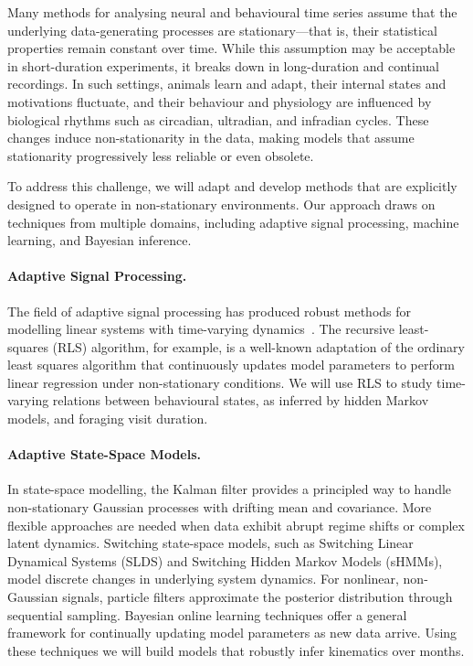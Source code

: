 

Many methods for analysing neural and behavioural time series assume that the
underlying data-generating processes are stationary—that is, their statistical
properties remain constant over time. While this assumption may be acceptable
in short-duration experiments, it breaks down in long-duration and continual
recordings. In such settings, animals learn and adapt, their internal states
and motivations fluctuate, and their behaviour and physiology are influenced by
biological rhythms such as circadian, ultradian, and infradian cycles. These
changes induce non-stationarity in the data, making models that assume
stationarity progressively less reliable or even obsolete.

To address this challenge, we will adapt and develop methods that are
explicitly designed to operate in non-stationary environments. Our approach
draws on techniques from multiple domains, including adaptive signal
processing, machine learning, and Bayesian inference.

\paragraph{Adaptive Signal Processing.}

The field of adaptive signal processing has produced robust methods for
modelling linear systems with time-varying dynamics~\cite{haykin02}. The
recursive least-squares (RLS) algorithm, for example, is a well-known
adaptation of the ordinary least squares algorithm that continuously updates
model parameters to perform linear regression under non-stationary conditions.
We will use RLS to study time-varying relations between behavioural states, as
inferred by hidden Markov models, and foraging visit duration.

\paragraph{Adaptive State-Space Models.}

In state-space modelling, the Kalman filter provides a principled way to handle
non-stationary Gaussian processes with drifting mean and covariance. More
flexible approaches are needed when data exhibit abrupt regime shifts or
complex latent dynamics. Switching state-space models, such as Switching Linear
Dynamical Systems (SLDS) and Switching Hidden Markov Models (sHMMs), model
discrete changes in underlying system dynamics. For nonlinear, non-Gaussian
signals, particle filters approximate the posterior distribution through
sequential sampling. Bayesian online learning techniques offer a general
framework for continually updating model parameters as new data arrive. Using
these techniques we will build models that robustly infer kinematics over
months.

